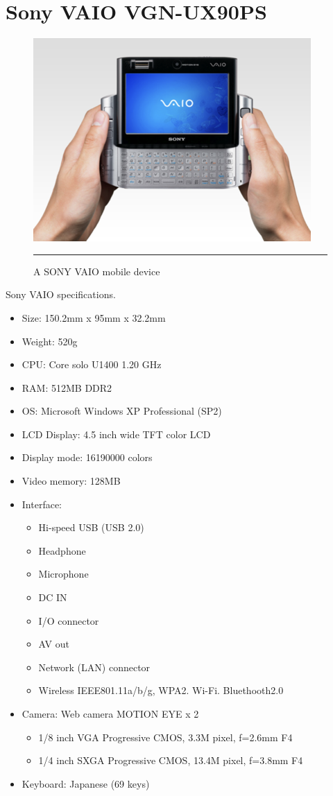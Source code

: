 \chapter{Sony VAIO VGN-UX90PS}
\label{AppendixA}

\begin{figure}[htbp]
  \centering
    \includegraphics{./Primitives/vaio.png}
    \rule{35em}{0.5pt}
  \caption[A SONY VAIO mobile device]{A SONY VAIO mobile device}
\end{figure}

Sony VAIO specifications.

\begin{itemize}
\item Size: 150.2mm x 95mm x 32.2mm
\item Weight: 520g
\item CPU: Core solo U1400 1.20 GHz
\item RAM: 512MB DDR2
\item OS: Microsoft Windows XP Professional (SP2)
\item LCD Display: 4.5 inch wide TFT color LCD
\item Display mode: 16190000 colors
\item Video memory: 128MB
\item Interface:
  \begin{itemize}
    \item Hi-speed USB (USB 2.0)
	\item Headphone
	\item Microphone
	\item DC IN
	\item I/O connector
	\item AV out
	\item Network (LAN) connector
	\item Wireless IEEE801.11a/b/g, WPA2. Wi-Fi. Bluethooth2.0
  \end{itemize}
\item Camera: Web camera MOTION EYE x 2
  \begin{itemize}
    \item 1/8 inch VGA Progressive CMOS, 3.3M pixel, f=2.6mm F4
	\item 1/4 inch SXGA Progressive CMOS, 13.4M pixel, f=3.8mm F4
  \end{itemize}
\item Keyboard: Japanese (69 keys)
\end{itemize}
